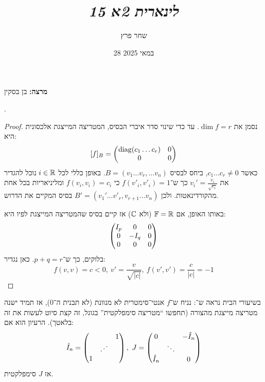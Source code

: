 \documentclass[]{../../../../tex/classes/styledArticle}
\author{שחר פרץ}
\title{\textit{לינארית 2א 15}}
\date{28 במאי 2025}
\begin{document}
    \maketitle
    \textbf{מרצה: }בן בסקין
    
    . 
    \begin{proof}
            
        נסמן את $\dim f = r$. עד כדי שינוי סדר איברי הבסיס, המטריצה המייצגת אלכסונית היא:
        \[ [f]_B = \begin{pmatrix} \operatorname{diag}(c_1 \dots c_r) & 0 \\ 0 & 0 \end{pmatrix} \]
        כאשר $c_1 \dots c_r \neq 0$, ביחס לבסיס $B = (v_1 \dots v_r, \dots v_n)$. באופן כללי לכל $i \in \mathbb{R}$ נוכל להגדיר את $v_i' = \frac{v_i}{\sqrt{c_i}}$ כך ש־$f(v'_i, v'_i) = 1$ כי $f(v_i, v_i) = c_i$ ומליניאריות בכל אחת מהקורדינאטות. ולכן $B' = (v_1' \dots v'_r, v_{r + 1} \dots v_n)$ בסיס המקיים את הדרוש. 
        
        באותו האופן, אם $\mathbb{F} = \mathbb{R}$ (ולא $\mathbb{C}$) אז קיים בסיס שהמטריצה המייצגת לפיו היא: 
        \[ \begin{pmatrix} I_p & 0 & 0 \\ 0& -I_q & 0 \\0 & 0 & 0 \end{pmatrix} \]
        בלוקים, כך ש־$p + q = r$. כאן נגדיר: 
        \[ f(v, v) = c < 0, \ v' = \frac{v}{\sqrt{|c|}}, \ f(v', v') = \frac{c}{|c|} = -1 \]
    \end{proof}
    
    בשיעורי הבית נראה ש־: נניח ש־$f$ אנטי־סימטרית לא מנוונת (לא תבנית ה־$0$), אז תמיד ישנה מטריצה מייצגת מהצורה (תחפשו ``מטריצה סימפלקטית'' בגוגל, זה קצת סיוט לעשות את זה בלאטך). הרעיון הוא אם: 
    \[ \hat I_n = \pms{ && 1 \\ & \reflectbox{$\ddots$} & \\ 1}, \ J = \pms{0 & & -\hat I_n \\ & \ddots & \\ \hat I_n && 0} \]
    אז $J$ סימפלקטית. 
    
    
\end{document}

